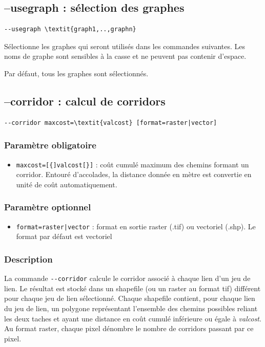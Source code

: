 \documentclass[a4paper,10pt]{report}
\begin{document}
\subsection{--usegraph : sélection des graphes}
\label{usegraph}
\begin{Verbatim}[commandchars=\\\{\}]
--usegraph \textit{graph1,..,graphn}
\end{Verbatim}
Sélectionne les graphes qui seront utilisés dans les commandes suivantes.
Les noms de graphe sont sensibles à la casse et ne peuvent pas contenir d'espace.

Par défaut, tous les graphes sont sélectionnés.

\subsection{--corridor : calcul de corridors}
\begin{Verbatim}[commandchars=\\\{\}]
--corridor maxcost=\textit{valcost} [format=raster|vector]
\end{Verbatim}

\subsubsection{Paramètre obligatoire}
\begin{itemize}
	\item \verb|maxcost=[{]valcost[}]| : coût cumulé maximum des chemins formant un corridor. Entouré d'accolades, la distance donnée en mètre est convertie en unité de coût automatiquement.
\end{itemize}

\subsubsection{Paramètre optionnel}
\begin{itemize}
	\item \verb+format=raster|vector+ : format en sortie raster (.tif) ou vectoriel (.shp). Le format par défaut est vectoriel
\end{itemize}

\subsubsection{Description}
La commande \verb|--corridor| calcule le corridor associé à chaque lien d'un jeu de lien.
Le résultat est stocké dans un shapefile (ou un raster au format tif) différent pour chaque jeu de lien sélectionné. Chaque shapefile contient, pour chaque lien du jeu de lien, un polygone représentant l'ensemble des chemins possibles reliant les deux taches et ayant une distance en coût cumulé inférieure ou égale à \textit{valcost}.
Au format raster, chaque pixel dénombre le nombre de corridors passant par ce pixel.
\end{document}
